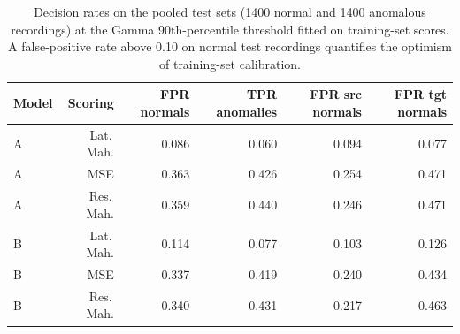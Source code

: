 \begin{table}[!htb]
\centering
\caption{Decision rates on the pooled test sets (1400 normal and 1400 anomalous recordings) at the Gamma 90th-percentile threshold fitted on training-set scores. A false-positive rate above 0.10 on normal test recordings quantifies the optimism of training-set calibration.}
\label{tab:rates}
\footnotesize
\renewcommand{\arraystretch}{1.18}
\begin{tabular}{lrrrrr}
\toprule
Model & Scoring & FPR normals & TPR anomalies & FPR src normals & FPR tgt normals \\
\midrule
A & Lat.\,Mah. & 0.086 & 0.060 & 0.094 & 0.077 \\
A & MSE & 0.363 & 0.426 & 0.254 & 0.471 \\
A & Res.\,Mah. & 0.359 & 0.440 & 0.246 & 0.471 \\
B & Lat.\,Mah. & 0.114 & 0.077 & 0.103 & 0.126 \\
B & MSE & 0.337 & 0.419 & 0.240 & 0.434 \\
B & Res.\,Mah. & 0.340 & 0.431 & 0.217 & 0.463 \\
\bottomrule
\end{tabular}
\end{table}